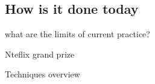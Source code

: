 \subsection{How is it done today}
what are the limits of current practice?

Nteflix grand prize \cite{@koren09}

Techniques overview \cite{@chen}


